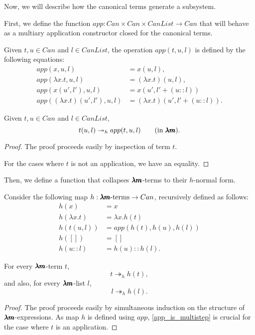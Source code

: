 Now, we will describe how the canonical terms generate a subsystem.

First, we define the function $app : Can \times Can \times CanList \to Can$ that will behave as a multiary application constructor closed for the canonical terms.

\begin{definition}
  Given $t, u \in Can$ and $l \in CanList$, the operation $app(t, u, l)$ is defined by the following equations:
  \begin{align*}
    app(x, u, l)                      &= x(u, l), \\
    app(\lambda x. t, u, l)           &= (\lambda x. t)(u, l), \\ 
    app(x(u', l'), u, l)              &= x(u', l' + (u::l)) \\
    app((\lambda x. t)(u', l'), u, l) &= (\lambda x. t)(u', l'+(u::l)).
  \end{align*}  
\end{definition}

\begin{lemma}
  \label{app_is_multistep}
  Given $t, u \in Can$ and $l \in CanList$, 
  \[ t(u, l) \twoheadrightarrow_h app(t, u, l) \qquad \text{(in $\pmb{\lambda m}$)}. \]
\end{lemma}
\begin{proof}
  The proof proceeds easily by inspection of term $t$.

  For the cases where $t$ is not an application, we have an equality.
\end{proof}

Then, we define a function that collapses $\pmb{\lambda m}$-terms to their $h$-normal form.

\begin{definition}
  Consider the following map $h : \pmb{\lambda m} \text{-terms} \to Can$, recursively defined as follows:
  \begin{align*}
    h(x)            &= x \\
    h(\lambda x. t) &= \lambda x . h(t) \\
    h(t(u,l))       &= app(h(t), h(u), h(l)) \\
    h([])           &= [] \\
    h(u::l)         &= h(u)::h(l).
  \end{align*}
\end{definition}

\begin{proposition}
  \label{h_is_multistep}
  For every $\pmb{\lambda m}$-term $t$, \[ t \twoheadrightarrow_h h(t), \]
  and also, for every $\pmb{\lambda m}$-list $l$, \[ l \twoheadrightarrow_h h(l). \]
\end{proposition}
\begin{proof}
  The proof proceeds easily by simultaneous induction on the structure of $\pmb{\lambda m}$-expressions.
  As map $h$ is defined using $app$, \cref{app_is_multistep} is crucial for the case where $t$ is an application. 
\end{proof}

